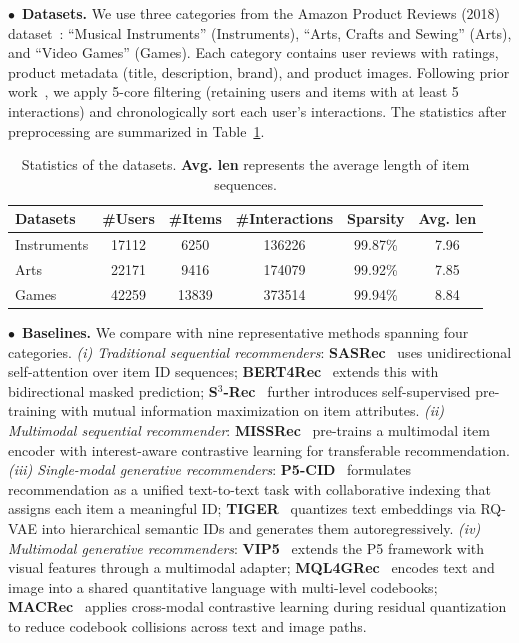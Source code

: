 \documentclass[sigconf, anonymous, review]{acmart}
\begin{document}
\noindent$\bullet$~\textbf{Datasets.}
We use three categories from the Amazon Product Reviews (2018) dataset~\cite{ni2019justifying}: ``Musical Instruments'' (Instruments), ``Arts, Crafts and Sewing'' (Arts), and ``Video Games'' (Games).
% 
Each category contains user reviews with ratings, product metadata (title, description, brand), and product images.
% 
Following prior work~\cite{tiger,macrec}, we apply 5-core filtering (retaining users and items with at least 5 interactions) and chronologically sort each user's interactions.
% 
The statistics after preprocessing are summarized in Table~\ref{dataset}.

\begin{table}[h]
\caption{Statistics of the datasets. \textbf{Avg. len} represents the average length of item sequences.}
\label{dataset}
\small
\centering
\setlength\tabcolsep{2pt}
\begin{tabular}{lccccc}
\toprule
\textbf{Datasets} & \textbf{\#Users} & \textbf{\#Items} & \textbf{\#Interactions} & \textbf{Sparsity} & \textbf{Avg. len} \\
\midrule
Instruments & 17112 & 6250  & 136226  & 99.87\% & 7.96 \\
Arts       & 22171 & 9416  & 174079  & 99.92\% & 7.85 \\
Games      & 42259 & 13839 & 373514  & 99.94\% & 8.84 \\
\bottomrule
\end{tabular}
\end{table}

\noindent$\bullet$~\textbf{Baselines.}
We compare with nine representative methods spanning four categories.
%
\textit{(i) Traditional sequential recommenders}: \textbf{SASRec}~\cite{sasrec} uses unidirectional self-attention over item ID sequences; \textbf{BERT4Rec}~\cite{sun2019bert4rec} extends this with bidirectional masked prediction; \textbf{S$^3$-Rec}~\cite{zhou2020s3} further introduces self-supervised pre-training with mutual information maximization on item attributes.
%
\textit{(ii) Multimodal sequential recommender}: \textbf{MISSRec}~\cite{wang2023missrec} pre-trains a multimodal item encoder with interest-aware contrastive learning for transferable recommendation.
%
\textit{(iii) Single-modal generative recommenders}: \textbf{P5-CID}~\cite{p5,hua2023index} formulates recommendation as a unified text-to-text task with collaborative indexing that assigns each item a meaningful ID; \textbf{TIGER}~\cite{tiger} quantizes text embeddings via RQ-VAE into hierarchical semantic IDs and generates them autoregressively.
%
\textit{(iv) Multimodal generative recommenders}: \textbf{VIP5}~\cite{vip5} extends the P5 framework with visual features through a multimodal adapter; \textbf{MQL4GRec}~\cite{mql} encodes text and image into a shared quantitative language with multi-level codebooks; \textbf{MACRec}~\cite{macrec} applies cross-modal contrastive learning during residual quantization to reduce codebook collisions across text and image paths.
\end{document}
